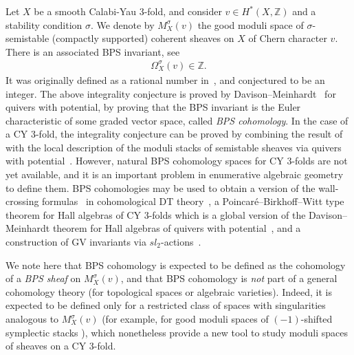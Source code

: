 \documentclass [11pt,oneside,a4paper,mathscr]{amsart}
\theoremstyle{definition}
\begin{document}
Let $X$ be a smooth Calabi-Yau $3$-fold, and consider $v\in H^{\ast}(X,\mathbb{Z})$
and a stability condition $\sigma$. 
We denote by $M^\sigma_X(v)$ the good moduli space of $\sigma$-semistable (compactly supported) coherent sheaves on $X$ of Chern character $v$. 
There is an associated BPS invariant, see~\cite[Equation (1.19)]{JS}
\begin{align*}\Omega^\sigma_X(v) \in \mathbb{Z}.
\end{align*}
It was originally defined as a rational number
in~\cite{JS, K-S}, and conjectured to be an integer. 
The above integrality conjecture is proved by Davison--Meinhardt~\cite{DM} for quivers with 
potential, 
by proving that the BPS invariant is the Euler characteristic of some graded vector space, called \textit{BPS cohomology}. 
In the case of a CY 3-fold, 
the integrality conjecture can be proved by 
combining the result of~\cite{DM} with 
the local description of the moduli stacks 
of semistable sheaves via quivers with potential~\cite{MR3811778}. 
However, natural 
BPS cohomology spaces for CY 3-folds are not yet available, 
and it is an important problem in enumerative algebraic geometry to define them. 
BPS cohomologies may be used to obtain 
a version of the wall-crossing formulas~\cite{JS, K-S} in 
cohomological DT theory~\cite{BDJS}, 
a Poincaré–Birkhoff–Witt type theorem for Hall algebras of CY 3-folds which is a global version of the Davison--Meinhardt theorem for Hall algebras of quivers with potential~\cite{DM}, 
and a construction of GV invariants via 
$sl_2$-actions~\cite{MT, TodGV}. 

We note here that BPS cohomology is expected to be defined as the cohomology of a \textit{BPS sheaf} on $M_X^{\sigma}(v)$, and that BPS cohomology is \textit{not} part of a general cohomology theory (for topological spaces or algebraic varieties). Indeed, it is expected to be defined only for a restricted class of spaces with singularities analogous to $M^\sigma_X(v)$ (for example, for good moduli spaces of $(-1)$-shifted symplectic stacks \cite{MR3090262}), which nonetheless provide a new tool to study moduli spaces of sheaves on a CY 3-fold. 
\end{document}
